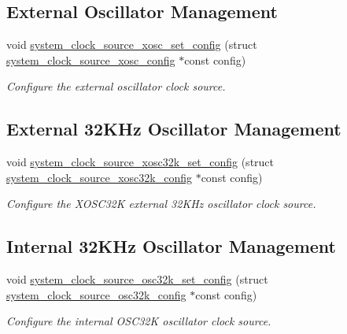 \subsection*{External Oscillator Management}
\begin{DoxyCompactItemize}
\item 
void \hyperlink{group__asfdoc__sam0__system__clock__group_gacd16e7e13de08d55c028620d845a5cb5}{system\+\_\+clock\+\_\+source\+\_\+xosc\+\_\+set\+\_\+config} (struct \hyperlink{structsystem__clock__source__xosc__config}{system\+\_\+clock\+\_\+source\+\_\+xosc\+\_\+config} $\ast$const config)
\begin{DoxyCompactList}\small\item\em Configure the external oscillator clock source. \end{DoxyCompactList}\end{DoxyCompactItemize}
\subsection*{External 32\+K\+Hz Oscillator Management}
\begin{DoxyCompactItemize}
\item 
void \hyperlink{group__asfdoc__sam0__system__clock__group_ga076bff009d78de95a0b2c9672f62b224}{system\+\_\+clock\+\_\+source\+\_\+xosc32k\+\_\+set\+\_\+config} (struct \hyperlink{structsystem__clock__source__xosc32k__config}{system\+\_\+clock\+\_\+source\+\_\+xosc32k\+\_\+config} $\ast$const config)
\begin{DoxyCompactList}\small\item\em Configure the X\+O\+S\+C32\+K external 32\+K\+Hz oscillator clock source. \end{DoxyCompactList}\end{DoxyCompactItemize}
\subsection*{Internal 32\+K\+Hz Oscillator Management}
\begin{DoxyCompactItemize}
\item 
void \hyperlink{group__asfdoc__sam0__system__clock__group_ga9c110273354846e5a6cf877d6180296f}{system\+\_\+clock\+\_\+source\+\_\+osc32k\+\_\+set\+\_\+config} (struct \hyperlink{structsystem__clock__source__osc32k__config}{system\+\_\+clock\+\_\+source\+\_\+osc32k\+\_\+config} $\ast$const config)
\begin{DoxyCompactList}\small\item\em Configure the internal O\+S\+C32\+K oscillator clock source. \end{DoxyCompactList}\end{DoxyCompactItemize}
